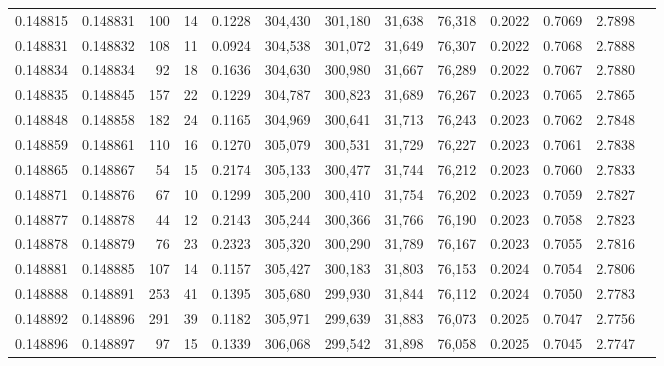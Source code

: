 \begin{tabular}{rrrrrrrrrrrrr}
0.148815 & 0.148831 &   100 &  14 &                                     0.1228 & 304,430 & 301,180 &  31,638 &  76,318 & 0.2022 & 0.7069 & 2.7898 \\
0.148831 & 0.148832 &   108 &  11 &                                     0.0924 & 304,538 & 301,072 &  31,649 &  76,307 & 0.2022 & 0.7068 & 2.7888 \\
0.148834 & 0.148834 &    92 &  18 &                                     0.1636 & 304,630 & 300,980 &  31,667 &  76,289 & 0.2022 & 0.7067 & 2.7880 \\
0.148835 & 0.148845 &   157 &  22 &                                     0.1229 & 304,787 & 300,823 &  31,689 &  76,267 & 0.2023 & 0.7065 & 2.7865 \\
0.148848 & 0.148858 &   182 &  24 &                                     0.1165 & 304,969 & 300,641 &  31,713 &  76,243 & 0.2023 & 0.7062 & 2.7848 \\
0.148859 & 0.148861 &   110 &  16 &                                     0.1270 & 305,079 & 300,531 &  31,729 &  76,227 & 0.2023 & 0.7061 & 2.7838 \\
0.148865 & 0.148867 &    54 &  15 &                                     0.2174 & 305,133 & 300,477 &  31,744 &  76,212 & 0.2023 & 0.7060 & 2.7833 \\
0.148871 & 0.148876 &    67 &  10 &                                     0.1299 & 305,200 & 300,410 &  31,754 &  76,202 & 0.2023 & 0.7059 & 2.7827 \\
0.148877 & 0.148878 &    44 &  12 &                                     0.2143 & 305,244 & 300,366 &  31,766 &  76,190 & 0.2023 & 0.7058 & 2.7823 \\
0.148878 & 0.148879 &    76 &  23 &                                     0.2323 & 305,320 & 300,290 &  31,789 &  76,167 & 0.2023 & 0.7055 & 2.7816 \\
0.148881 & 0.148885 &   107 &  14 &                                     0.1157 & 305,427 & 300,183 &  31,803 &  76,153 & 0.2024 & 0.7054 & 2.7806 \\
0.148888 & 0.148891 &   253 &  41 &                                     0.1395 & 305,680 & 299,930 &  31,844 &  76,112 & 0.2024 & 0.7050 & 2.7783 \\
0.148892 & 0.148896 &   291 &  39 &                                     0.1182 & 305,971 & 299,639 &  31,883 &  76,073 & 0.2025 & 0.7047 & 2.7756 \\
0.148896 & 0.148897 &    97 &  15 &                                     0.1339 & 306,068 & 299,542 &  31,898 &  76,058 & 0.2025 & 0.7045 & 2.7747 \\

\end{tabular}
